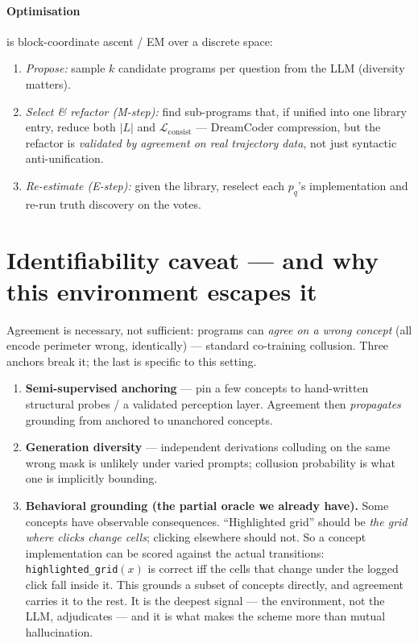 \documentclass[11pt]{article}
\newcommand{\Lconsist}{\mathcal{L}_{\mathrm{consist}}}
\begin{document}
\paragraph{Optimisation} is block-coordinate ascent / EM over a discrete space:
\begin{enumerate}[nosep]
  \item \emph{Propose:} sample $k$ candidate programs per question from the LLM
        (diversity matters).
  \item \emph{Select \& refactor (M-step):} find sub-programs that, if unified
        into one library entry, reduce both $|L|$ and $\Lconsist$ --- DreamCoder
        compression, but the refactor is \emph{validated by agreement on real
        trajectory data}, not just syntactic anti-unification.
  \item \emph{Re-estimate (E-step):} given the library, reselect each $p_q$'s
        implementation and re-run truth discovery on the votes.
\end{enumerate}

\section{Identifiability caveat --- and why this environment escapes it}

Agreement is necessary, not sufficient: programs can \emph{agree on a wrong
concept} (all encode perimeter wrong, identically) --- standard co-training
collusion. Three anchors break it; the last is specific to this setting.

\begin{enumerate}[nosep]
  \item \textbf{Semi-supervised anchoring} --- pin a few concepts to hand-written
        structural probes / a validated perception layer. Agreement then
        \emph{propagates} grounding from anchored to unanchored concepts.
  \item \textbf{Generation diversity} --- independent derivations colluding on the
        same wrong mask is unlikely under varied prompts; collusion probability is
        what one is implicitly bounding.
  \item \textbf{Behavioral grounding (the partial oracle we already have).} Some
        concepts have observable consequences. ``Highlighted grid'' should be
        \emph{the grid where clicks change cells}; clicking elsewhere should not.
        So a concept implementation can be scored against the actual transitions:
        \texttt{highlighted\_grid}$(x)$ is correct iff the cells that change under
        the logged click fall inside it. This grounds a subset of concepts
        directly, and agreement carries it to the rest. It is the deepest signal
        --- the environment, not the LLM, adjudicates --- and it is what makes the
        scheme more than mutual hallucination.
\end{enumerate}
\end{document}
